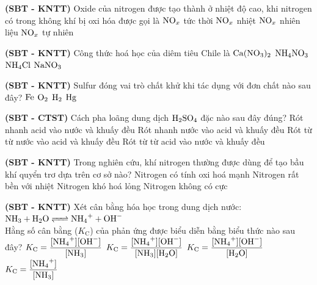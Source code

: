 \documentclass[12pt,a4paper]{article}
\begin{document}
\begin{ex}
\textbf{(SBT - KNTT)} Oxide của nitrogen được tạo thành ở nhiệt độ cao, khi nitrogen có trong không khí bị oxi hóa được gọi là
\choice
{$\ce{NO_x}$ tức thời}
{\True $\ce{NO_x}$ nhiệt}
{$\ce{NO_x}$ nhiên liệu}
{$\ce{NO_x}$ tự nhiên}

\end{ex}

\begin{ex}
\textbf{(SBT - KNTT)} Công thức hoá học của diêm tiêu Chile là
\choice
{$\ce{Ca(NO3)2}$}
{$\ce{NH4NO3}$}
{$\ce{NH4Cl}$}
{\True $\ce{NaNO3}$}

\end{ex}

\begin{ex}
\textbf{(SBT - KNTT)} Sulfur đóng vai trò chất khử khi tác dụng với đơn chất nào sau đây?
\choice
{$\ce{Fe}$}
{\True $\ce{O2}$}
{$\ce{H2}$}
{$\ce{Hg}$}

\end{ex}

\begin{ex}
\textbf{(SBT - CTST)} Cách pha loãng dung dịch $\ce{H2SO4}$ đặc nào sau đây đúng?
\choice
{Rót nhanh acid vào nước và khuấy đều}
{Rót nhanh nước vào acid và khuấy đều}
{Rót từ từ nước vào acid và khuấy đều}
{\True Rót từ từ acid vào nước và khuấy đều}

\end{ex}

\begin{ex}
\textbf{(SBT - KNTT)} Trong nghiên cứu, khí nitrogen thường được dùng để tạo bầu khí quyển trơ dựa trên cơ sở nào?
\choice
{Nitrogen có tính oxi hoá mạnh}
{\True Nitrogen rất bền với nhiệt}
{Nitrogen khó hoá lỏng}
{Nitrogen không có cực}

\end{ex}

\begin{ex}
\textbf{(SBT - KNTT)} Xét cân bằng hóa học trong dung dịch nước:\\
$\ce{NH3 + H2O <=> NH4+ + OH-}$\\
Hằng số cân bằng ($K_\text{C}$) của phản ứng được biểu diễn bằng biểu thức nào sau đây?
\choice
{\True $K_\text{C} = \dfrac{[\ce{NH4+}][\ce{OH-}]}{[\ce{NH3}]}$}
{$K_\text{C} = \dfrac{[\ce{NH4+}][\ce{OH-}]}{[\ce{NH3}][\ce{H2O}]}$}
{$K_\text{C} = \dfrac{[\ce{NH4+}][\ce{OH-}]}{[\ce{H2O}]}$}
{$K_\text{C} = \dfrac{[\ce{NH4+}]}{[\ce{NH3}]}$}

\end{ex}
\end{document}

